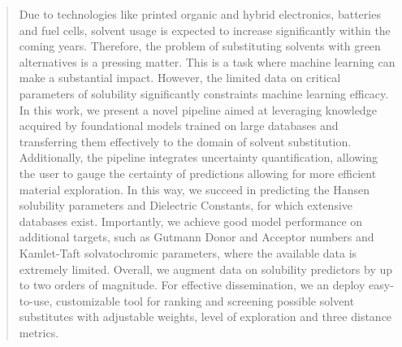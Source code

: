 \documentclass[
  english,        %
  font=times,     %
  onecolumn,      %
]{article}
\begin{document}
\begin{abstract}
Due to technologies like printed organic and hybrid electronics, batteries and fuel cells,  solvent usage is expected to increase significantly within the coming years. Therefore, the problem of substituting solvents with green alternatives is a pressing matter.  This is a task where machine learning can make a substantial impact. However, the limited  data on critical parameters of solubility significantly constraints machine learning efficacy. In this work, we present a novel pipeline aimed at leveraging knowledge acquired by foundational models trained on large databases and transferring them effectively to the domain of solvent substitution. Additionally, the pipeline integrates uncertainty quantification, allowing the user to gauge the certainty of predictions allowing for more efficient material exploration. In this way, we succeed in predicting the Hansen solubility parameters and Dielectric Constants, for which extensive databases exist. Importantly, we achieve good model performance on additional targets, such as Gutmann Donor and Acceptor numbers and Kamlet-Taft solvatochromic parameters, where the available data is extremely limited. Overall, we augment data on solubility predictors by up to two orders of magnitude. For effective dissemination, we an deploy easy-to-use, customizable tool for ranking and screening possible solvent substitutes with adjustable weights, level of exploration and three distance metrics.




\end{abstract}
\end{document}
